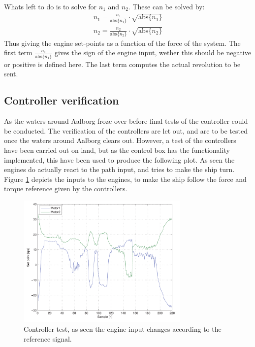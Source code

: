 \documentclass{ifacconf}
\begin{document}
Whats left to do is to solve for $n_1$ and $n_2$. These can be solved by:
\begin{align}
n_1 = \frac{n_1}{\text{abs}\{n_1\}} \cdot \sqrt{\text{abs}\{n_1\}}\\
n_2 = \frac{n_2}{\text{abs}\{n_2\}} \cdot \sqrt{\text{abs}\{n_2\}}
\end{align}
Thus giving the engine set-points as a function of the force of the system. The first term $\frac{n_1}{\text{abs}\{n_1\}}$ gives the sign of the engine input, wether this should be negative or positive is defined here. The last term computes the actual revolution to be sent. 


\subsection{Controller verification}
As the waters around Aalborg froze over before final tests of the controller could be conducted. The verification of the controllers are let out, and are to be tested once the waters around Aalborg clears out. However, a test of the controllers have been carried out on land, but as the control box has the functionality implemented, this have been used to produce the following plot. As seen the engines do actually react to the path input, and tries to make the ship turn. Figure \ref{fig:control} depicts the inputs to the engines, to make the ship follow the force and torque reference given by the controllers.
\begin{figure}
	\begin{center}
		\includegraphics[width=8.4cm]{img/motorinput}    %
		\caption{Controller test, as seen the engine input changes according to the reference signal. }
		\label{fig:control}               
	\end{center}                                 %
\end{figure}
\end{document}
